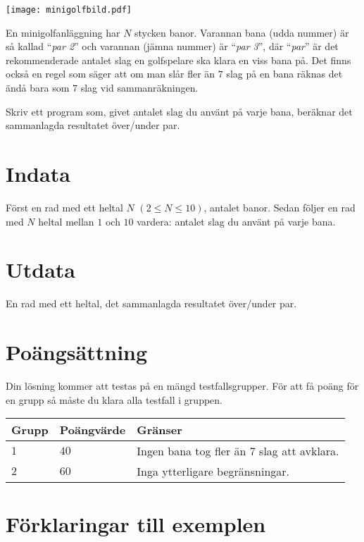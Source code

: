 
\begin{center}
\texttt{[image: minigolfbild.pdf]}
\end{center}

En minigolfanläggning har $N$ stycken banor. Varannan bana (udda nummer) är så kallad ``{\em par 2}'' och
varannan (jämna nummer) är ``{\em par 3}'', där ``{\em par}'' är det rekommenderade antalet slag en golfspelare ska klara
en viss bana på. Det finns också en regel som säger att om man slår fler än $7$ slag på en bana räknas det ändå
bara som $7$ slag vid sammanräkningen.

Skriv ett program som, givet antalet slag du använt på varje bana, beräknar det sammanlagda resultatet över/under par. 

\section*{Indata}
Först en rad med ett heltal $N$ $(2\le N\le 10)$, antalet banor. Sedan följer en rad med $N$ heltal mellan $1$ och $10$ vardera: antalet slag du använt på varje bana.

\section*{Utdata}
En rad med ett heltal, det sammanlagda resultatet över/under par.

\section*{Poängsättning}
Din lösning kommer att testas på en mängd testfallsgrupper.
För att få poäng för en grupp så måste du klara alla testfall i gruppen.

\noindent
\begin{tabular}{| l | l | l |}
\hline
  Grupp & Poängvärde & Gränser \\ \hline
  $1$    & $40$       &  Ingen bana tog fler än 7 slag att avklara.  \\ \hline 
  $2$    & $60$       &  Inga ytterligare begränsningar. \\ \hline
\end{tabular}

\section*{Förklaringar till exemplen}

